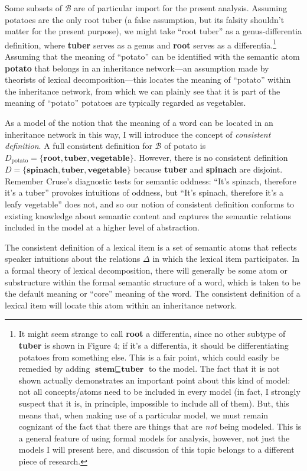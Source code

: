 Some subsets of $\mathcal{B}$ are of particular import for the present analysis. Assuming potatoes are the only root tuber (a false assumption, but its falsity shouldn't matter for the present purpose), we might take ``root tuber'' as a genus-differentia definition, where {\bf tuber} serves as a genus and {\bf root} serves as a differentia.\footnote{It might seem strange to call {\bf root} a differentia, since no other subtype of {\bf tuber} is shown in Figure 4; if it's a differentia, it should be differentiating potatoes from something else. This is a fair point, which could easily be remedied by adding $\textbf{stem}\sqsubseteq\textbf{tuber}$ to the model. The fact that it is not shown actually demonstrates an important point about this kind of model: not all concepts/atoms need to be included in every model (in fact, I strongly suspect that it is, in principle, impossible to include all of them). But, this means that, when making use of a particular model, we must remain cognizant of the fact that there are things that are \emph{not} being modeled. This is a general feature of using formal models for analysis, however, not just the models I will present here, and discussion of this topic belongs to a different piece of research.} Assuming that the meaning of ``potato'' can be identified with the semantic atom {\bf potato} that belongs in an inheritance network---an assumption made by theorists of lexical decomposition---this locates the meaning of ``potato'' within the inheritance network, from which we can plainly see that it is part of the meaning of ``potato'' potatoes are typically regarded as vegetables.

As a model of the notion that the meaning of a word can be located in an inheritance network in this way, I will introduce the concept of \emph{consistent definition}. A full consistent definition for $\mathcal{B}$ of potato is $D_\text{potato}=\{\textbf{root},\textbf{tuber},\textbf{vegetable}\}$. However, there is no consistent definition $D=\{\textbf{spinach},\textbf{tuber},\textbf{vegetable}\}$ because {\bf tuber} and {\bf spinach} are disjoint. Remember Cruse's diagnostic tests for semantic oddness: ``It's spinach, therefore it's a tuber'' provokes intuitions of oddness, but ``It's spinach, therefore it's a leafy vegetable'' does not, and so our notion of consistent definition conforms to existing knowledge about semantic content and captures the semantic relations included in the model at a higher level of abstraction.

The consistent definition of a lexical item is a set of semantic atoms that reflects speaker intuitions about the relations $\Delta$ in which the lexical item participates. In a formal theory of lexical decomposition, there will generally be some atom or substructure within the formal semantic structure of a word, which is taken to be the default meaning or ``core'' meaning of the word. The consistent definition of a lexical item will locate this atom within an inheritance network.

